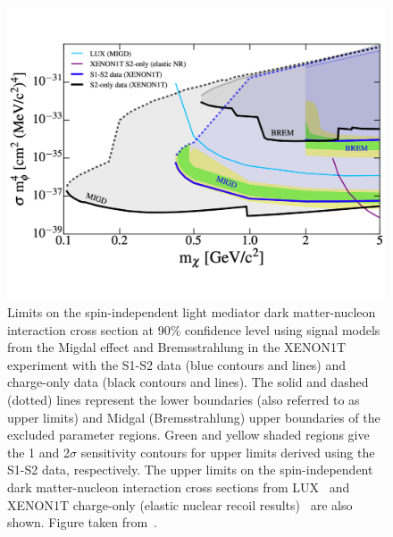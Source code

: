 \begin{figure}[!htbp] 
\begin{center}
\includegraphics[width=0.99\columnwidth]{fig_x1t_migdal.pdf}
\caption{Limits on the spin-independent light mediator dark matter-nucleon interaction cross section at 90\% confidence level using signal models from the Migdal effect and Bremsstrahlung in the XENON1T experiment with the S1-S2 data (blue contours and lines) and charge-only data (black contours and lines). The solid and dashed (dotted) lines represent the lower boundaries (also referred to as upper limits) and Midgal (Bremsstrahlung) upper boundaries of the excluded parameter regions. Green and yellow shaded regions give the 1 and 2$\sigma$ sensitivity contours for upper limits derived using the S1-S2 data, respectively. The upper limits on the spin-independent dark matter-nucleon interaction cross sections from LUX~\cite{Akerib:2018hck} and XENON1T charge-only (elastic nuclear recoil results)~\cite{Aprile:2019xxb} are also shown. Figure taken from~\cite{Aprile:2019jmx}.}
\label{fig:migdal}
\end{center} 
\end{figure}

